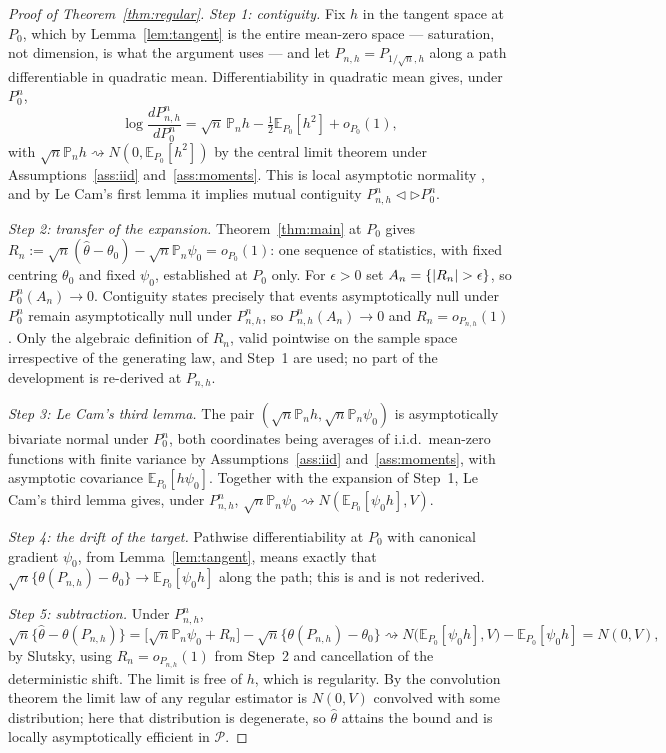 \documentclass[11pt]{article}
\theoremstyle{plain}
\theoremstyle{definition}
\theoremstyle{remark}
\newcommand{\E}{\mathbb{E}}
\newcommand{\Pn}{\mathbb{P}_n}
\newcommand{\cP}{\mathcal{P}}
\newcommand{\thetahat}{\widehat{\theta}}
\DeclarePairedDelimiter{\abs}{\lvert}{\rvert}
\begin{document}
\begin{proof}[Proof of Theorem~\ref{thm:regular}]
\emph{Step 1: contiguity.} Fix $h$ in the tangent space at $P_0$, which by
Lemma~\ref{lem:tangent} is the entire mean-zero space --- saturation, not
dimension, is what the argument uses --- and let
$P_{n,h}=P_{1/\sqrt n,h}$ along a path differentiable in quadratic mean.
Differentiability in quadratic mean gives, under $P_0^n$,
\[
  \log\frac{dP_{n,h}^n}{dP_0^n}
  =\sqrt n\,\Pn h-\tfrac12\E_{P_0}[h^2]+o_{P_0}(1),
\]
with $\sqrt n\Pn h\rightsquigarrow N(0,\E_{P_0}[h^2])$ by the central limit
theorem under Assumptions~\ref{ass:iid} and~\ref{ass:moments}. This is local
asymptotic normality \citep{vandervaart1998}, and by Le Cam's first lemma it
implies mutual contiguity $P_{n,h}^n\triangleleft\triangleright P_0^n$.

\emph{Step 2: transfer of the expansion.} Theorem~\ref{thm:main} at $P_0$ gives
$R_n:=\sqrt n(\thetahat-\theta_0)-\sqrt n\Pn\psi_0=o_{P_0}(1)$: one sequence of
statistics, with fixed centring $\theta_0$ and fixed $\psi_0$, established at
$P_0$ only. For $\epsilon>0$ set $A_n=\{\abs{R_n}>\epsilon\}$, so
$P_0^n(A_n)\to0$. Contiguity states precisely that events asymptotically null
under $P_0^n$ remain asymptotically null under $P_{n,h}^n$, so
$P_{n,h}^n(A_n)\to0$ and $R_n=o_{P_{n,h}}(1)$. Only the algebraic definition of
$R_n$, valid pointwise on the sample space irrespective of the generating law, and
Step~1 are used; no part of the development is re-derived at $P_{n,h}$.

\emph{Step 3: Le Cam's third lemma.} The pair $(\sqrt n\Pn h,\sqrt n\Pn\psi_0)$
is asymptotically bivariate normal under $P_0^n$, both coordinates being averages
of i.i.d.\ mean-zero functions with finite variance by
Assumptions~\ref{ass:iid} and~\ref{ass:moments}, with asymptotic covariance
$\E_{P_0}[h\psi_0]$. Together with the expansion of Step~1, Le Cam's third lemma
gives, under $P_{n,h}^n$,
$\sqrt n\Pn\psi_0\rightsquigarrow N(\E_{P_0}[\psi_0h],V)$.

\emph{Step 4: the drift of the target.} Pathwise differentiability at $P_0$ with
canonical gradient $\psi_0$, from Lemma~\ref{lem:tangent}, means exactly that
$\sqrt n\{\theta(P_{n,h})-\theta_0\}\to\E_{P_0}[\psi_0h]$ along the path; this is
\citet{hahn1998} and is not rederived.

\emph{Step 5: subtraction.} Under $P_{n,h}^n$,
\[
  \sqrt n\bigl\{\thetahat-\theta(P_{n,h})\bigr\}
  =\bigl[\sqrt n\Pn\psi_0+R_n\bigr]
   -\sqrt n\bigl\{\theta(P_{n,h})-\theta_0\bigr\}
  \rightsquigarrow N\bigl(\E_{P_0}[\psi_0h],V\bigr)-\E_{P_0}[\psi_0h]=N(0,V),
\]
by Slutsky, using $R_n=o_{P_{n,h}}(1)$ from Step~2 and cancellation of the
deterministic shift. The limit is free of $h$, which is regularity. By the
convolution theorem the limit law of any regular estimator is $N(0,V)$ convolved
with some distribution; here that distribution is degenerate, so $\thetahat$
attains the bound and is locally asymptotically efficient in $\cP$.
\end{proof}
\end{document}
